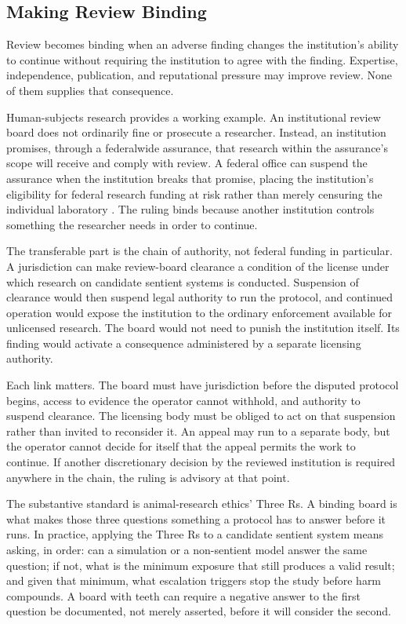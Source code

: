 \subsection{Making Review Binding}
\label{sec:making-binding}

Review becomes binding when an adverse finding changes the institution's
ability to continue without requiring the institution to agree with the
finding. Expertise, independence, publication, and reputational pressure
may improve review. None of them supplies that consequence.

Human-subjects research provides a working example. An institutional
review board does not ordinarily fine or prosecute a researcher.
Instead, an institution promises, through a federalwide assurance, that
research within the assurance's scope will receive and comply with
review. A federal office can suspend the assurance when the institution
breaks that promise, placing the institution's eligibility for federal
research funding at risk rather than merely censuring the individual
laboratory \autocite{ohrp2018fwa}. The ruling binds because another
institution controls something the researcher needs in order to
continue.

The transferable part is the chain of authority, not federal funding in
particular. A jurisdiction can make review-board clearance a condition
of the license under which research on candidate sentient systems is
conducted. Suspension of clearance would then suspend legal authority to
run the protocol, and continued operation would expose the institution
to the ordinary enforcement available for unlicensed research. The
board would not need to punish the institution itself. Its finding would
activate a consequence administered by a separate licensing authority.

Each link matters. The board must have jurisdiction before the disputed
protocol begins, access to evidence the operator cannot withhold, and
authority to suspend clearance. The licensing body must be obliged to
act on that suspension rather than invited to reconsider it. An appeal
may run to a separate body, but the operator cannot decide for itself
that the appeal permits the work to continue. If another discretionary
decision by the reviewed institution is required anywhere in the chain,
the ruling is advisory at that point.

The substantive standard is animal-research ethics' Three Rs. A binding board is what makes those three questions something a protocol has to answer before it runs. In practice, applying the Three Rs to a candidate sentient system means asking, in order: can a simulation or a non-sentient model answer the same question; if not, what is the minimum exposure that still produces a valid result; and given that minimum, what escalation triggers stop the study before harm compounds. A board with teeth can require a negative answer to the first question be documented, not merely asserted, before it will consider the second.

